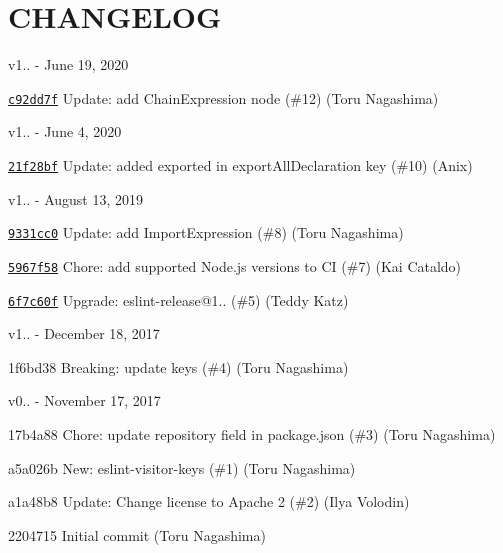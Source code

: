 \chapter{CHANGELOG}
\hypertarget{md__c_1_2_users_2_s_t_r_i_d_e_r_2source_2repos_2_internal_a_p_i_2_internal_a_p_i_2wwwroot_2lib_2c25601cb84f968dd7d52e3204b38c7f2}{}\label{md__c_1_2_users_2_s_t_r_i_d_e_r_2source_2repos_2_internal_a_p_i_2_internal_a_p_i_2wwwroot_2lib_2c25601cb84f968dd7d52e3204b38c7f2}
v1.. -\/ June 19, 2020


\begin{DoxyItemize}
\item \href{https://github.com/eslint/eslint-visitor-keys/commit/c92dd7ff96f0044dba12d681406a025b92b4c437}{\texttt{ {\ttfamily c92dd7f}}} Update\+: add {\ttfamily Chain\+Expression} node (\#12) (Toru Nagashima)
\end{DoxyItemize}

v1.. -\/ June 4, 2020


\begin{DoxyItemize}
\item \href{https://github.com/eslint/eslint-visitor-keys/commit/21f28bf11be5329d740a8bf6bdbcd0ef13bbf1a2}{\texttt{ {\ttfamily 21f28bf}}} Update\+: added exported in export\+All\+Declaration key (\#10) (Anix)
\end{DoxyItemize}

v1.. -\/ August 13, 2019


\begin{DoxyItemize}
\item \href{https://github.com/eslint/eslint-visitor-keys/commit/9331cc09e756e65b9044c9186445a474b037fac6}{\texttt{ {\ttfamily 9331cc0}}} Update\+: add Import\+Expression (\#8) (Toru Nagashima)
\item \href{https://github.com/eslint/eslint-visitor-keys/commit/5967f583b04f17fba9226aaa394e45d476d2b8af}{\texttt{ {\ttfamily 5967f58}}} Chore\+: add supported Node.\+js versions to CI (\#7) (Kai Cataldo)
\item \href{https://github.com/eslint/eslint-visitor-keys/commit/6f7c60fef2ceec9f6323202df718321cec45cab0}{\texttt{ {\ttfamily 6f7c60f}}} Upgrade\+: eslint-\/release@1.. (\#5) (Teddy Katz)
\end{DoxyItemize}

v1.. -\/ December 18, 2017


\begin{DoxyItemize}
\item 1f6bd38 Breaking\+: update keys (\#4) (Toru Nagashima)
\end{DoxyItemize}

v0.. -\/ November 17, 2017


\begin{DoxyItemize}
\item 17b4a88 Chore\+: update {\ttfamily repository} field in package.\+json (\#3) (Toru Nagashima)
\item a5a026b New\+: eslint-\/visitor-\/keys (\#1) (Toru Nagashima)
\item a1a48b8 Update\+: Change license to Apache 2 (\#2) (Ilya Volodin)
\item 2204715 Initial commit (Toru Nagashima) 
\end{DoxyItemize}